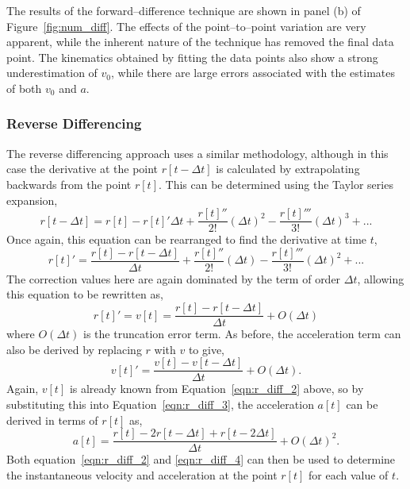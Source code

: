 The results of the forward--difference technique are shown in panel (b) of Figure~\ref{fig:num_diff}. The effects of the point--to--point variation are very apparent, while the inherent nature of the technique has removed the final data point. The kinematics obtained by fitting the data points also show a strong underestimation of $v_0$, while there are large errors associated with the estimates of both $v_0$ and $a$.

\subsubsection{Reverse Differencing}
\label{subsubsect:r_diff}

The reverse differencing approach uses a similar methodology, although in this case the derivative at the point $r[t-\Delta t]$ is calculated by extrapolating backwards from the point $r[t]$. This can be determined using the Taylor series expansion,
\begin{equation}
r[t - \Delta t] = r[t] - r[t]'\Delta t +  \frac{r[t]''}{2!}(\Delta t)^{2} - \frac{r[t]'''}{3!}(\Delta t)^{3}  + ... \label{eqn:r_diff_0}
\end{equation}
Once again, this equation can be rearranged to find the derivative at time $t$,
\begin{equation}
r[t]' = \frac{r[t] - r[t - \Delta t]}{\Delta t} +  \frac{r[t]''}{2!}(\Delta t) - \frac{r[t]'''}{3!}(\Delta t)^{2}  + ... \label{eqn:r_diff_1}
\end{equation}
The correction values here are again dominated by the term of order $\Delta t$, allowing this equation to be rewritten as,
\begin{equation}
r[t]' = v[t] = \frac{r[t] - r[t - \Delta t]}{\Delta t} + O(\Delta t) \label{eqn:r_diff_2}
\end{equation}
where $O(\Delta t)$ is the truncation error term. As before, the acceleration term can also be derived by replacing $r$ with $v$ to give,
\begin{equation}
v[t]' = \frac{v[t] - v[t - \Delta t]}{\Delta t} + O(\Delta t). \label{eqn:r_diff_3}
\end{equation}
Again, $v[t]$ is already known from Equation~\ref{eqn:r_diff_2} above, so by substituting this into Equation~\ref{eqn:r_diff_3}, the acceleration $a[t]$ can be derived in terms of $r[t]$ as,
\begin{equation}
a[t] = \frac{r[t] - 2r[t-\Delta t] + r[t - 2\Delta t]}{\Delta t} + O(\Delta t)^2 . \label{eqn:r_diff_4}
\end{equation}
Both equation~\ref{eqn:r_diff_2} and \ref{eqn:r_diff_4} can then be used to determine the instantaneous velocity and acceleration at the point $r[t]$ for each value of $t$. 

